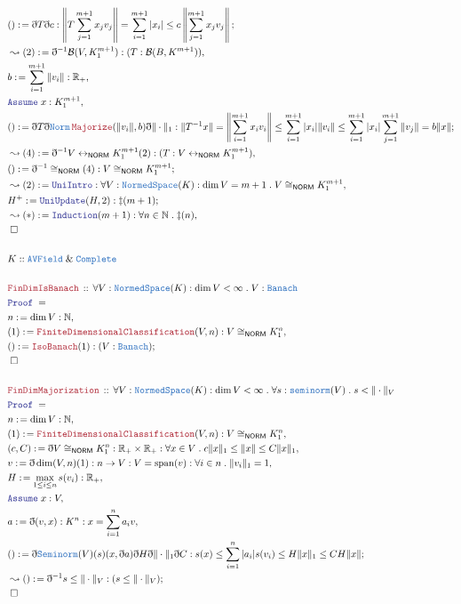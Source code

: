 \documentclass[12pt]{scrartcl}
\newcommand{\TYPE}[1]{\textcolor{NavyBlue}{\mathtt{#1}}}
\newcommand{\LOGIC}[1]{\textcolor{Blue}{\mathtt{#1}}}
\newcommand{\THM}[1]{\textcolor{Maroon}{\mathtt{#1}}}
\renewcommand{\.}{\; . \;}
\newcommand{\de}{: \kern 0.1pc =}
\newcommand{\Theorem}[2]{& \THM{#1} \, :: \, #2 \\ & \Proof = \\ }
\newcommand{\Page}[1]{\begin{align*} #1 \end{align*} \newpage   }
\newcommand{ \bd }{ \ByDef }
\renewcommand{\And}{\; \& \;}
\newcommand{\Reals}{\mathbb{R} }
\newcommand{\Nat}{\mathbb{N} }
\newcommand{\ToBij}{\leftrightarrow}
\newcommand{\Say}[3]{& #1 \de #2 : #3, \\}
\newcommand{\Conclude}[3]{& #1 \de #2 : #3; \\}
\newcommand{\Derive}[3]{& \leadsto #1 \de #2 : #3, \\}
\newcommand{\DeriveConclude}[3]{& \leadsto #1 \de #2 : #3 ; \\}
\newcommand{\A}{\LOGIC{Assume} \;}
\newcommand{\Assume}[2]{& \A #1 : #2, \\}
\newcommand{\QED}{\; \square}
\newcommand{\EndProof}{& \QED \\}
\newcommand{\ByDef}{\eth}
\newcommand{\Proof}{\LOGIC{Proof} \; }
\newcommand{\avfield}{\TYPE{AVField}}
\DeclareMathOperator{\Span}{span}
\newcommand{\Complete}{\TYPE{Complete}}
\newcommand{\NS}{\TYPE{NormedSpace}}
\newcommand{\Banach}{\TYPE{Banach}}
\newcommand{\NORM}{\textsf{NORM}}
\newcommand{\B}{\mathcal{B}}
\begin{document}
\Page{
 \Conclude{()}{ \bd T \bd c }{ \left\| T  \sum^{m + 1}_{j = 1} x_j v_j  \right\|  = \sum^{m + 1}_{i = 1} | x_i|
 \le  c\left\|  \sum^{m + 1}_{j = 1} x_j v_j  \right\|
}
 \Derive{(2)}{\bd^{-1}\B(V,K^{m + 1}_1)}{(T : \B(B,K^{m + 1}))}
 \Say{b}{ \sum^{m + 1}_{i = 1} \| v_i \| }{\Reals_+}
 \Assume{x}{K^{m + 1}_1}
 \Conclude{()}{\bd T \bd \TYPE{Norm} \, \THM{Majorize}(\|v_i\|, b) \bd \| \cdot \|_1}{ \| T^{-1} x \| = \left \| \sum^{m + 1}_{i = 1} x_i v_i \right \|
 \le \sum^{m + 1}_{i = 1} |x_i|\| v_i  \| \le  \sum^{m + 1}_{i = 1} |x_i| \sum^{m + 1}_{j = 1} \| v_j \| = b \| x \|
 }
 \Derive{(4)}{\bd^{-1}V \ToBij_{\NORM} K^{m + 1}_{1}(2)}{(T : V \ToBij_{\NORM} K^{m + 1}_{1})}
 \Conclude{()}{\bd^{-1} \cong_\NORM(4)}{ V \cong_{\NORM} K^{m + 1}_1}
 \Derive{(2)}{\LOGIC{UniIntro}}{\forall V : \NS(K) : \dim V = m + 1 \. V \cong_\NORM K^{m + 1}_1}
 \Conclude{H^+}{\LOGIC{UniUpdate}(H,2)}{ \ddag(m + 1) }
 \Derive{(*)}{\LOGIC{Induction}(m + 1)}{\forall n \in \Nat \.  \ddag(n) }
 \EndProof
 \\
 & K :: \avfield \And \Complete \\
 \\
 \Theorem{FinDimIsBanach}{\forall V : \NS(K) : \dim V < \infty \. V : \Banach}
 \Say{n}{\dim V}{\Nat}
 \Say{(1)}{\THM{FiniteDimensionalClassification}(V,n)}{V \cong_{\NORM} K_1^n}
 \Conclude{()}{\THM{IsoBanach}(1)}{(V : \Banach)}
 \EndProof
 \\
 \Theorem{FinDimMajorization}{\forall V  : \NS(K) : \dim V < \infty \. 
          \forall s : \TYPE{seminorm}(V) \.  s < \|  \cdot \|_V
  }
  \Say{n}{\dim V}{\Nat}
  \Say{(1)}{\THM{FiniteDimensionalClassification}(V,n)}{V \cong_{\NORM} K_1^n}
  \Say{(c,C)}{\bd V \cong_{\NORM} K_1^n }{\Reals_+ \times \Reals_+ :
     \forall x \in V \. c\| x \|_1 \le \| x \| \le C\| x \|_1  
  }
  \Say{v}{\bd \dim(V,n)(1)}{ n \to V : V = \Span(v) : \forall i \in n \. \| v_i \|_1 = 1}
  \Say{H}{\max_{1 \le i \le n} s(v_i)}{\Reals_+}
  \Assume{x}{V}
  \Say{ a }{ \bd(v,x)}{ K^n : x = \sum^n_{i = 1} a_i v }
  \Conclude{()}{\bd \TYPE{Seminorm}(V)(s)(x,\bd a) \bd H \bd \| \cdot \|_1
  \bd  C 
  }{ s(x)\le \sum^n_{i = 1} |a_i|s(v_i) \le H \| x  \|_1 \le CH \| x \|}
  \DeriveConclude{()}{\bd^{-1} s \le \| \cdot \|_V }{ (s \le \| \cdot \|_V)}
  \EndProof
}
\end{document}
